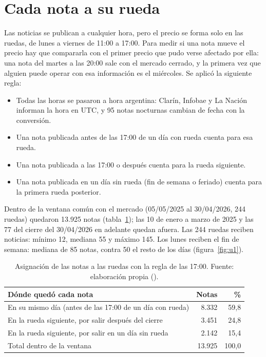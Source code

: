 \section{Cada nota a su rueda}
\label{sec:alineacion}

Las noticias se publican a cualquier hora, pero el precio se forma solo en las ruedas, de lunes
a viernes de 11:00 a 17:00. Para medir si una nota mueve el precio hay que compararla con el
primer precio que pudo verse afectado por ella: una nota del martes a las 20:00 sale con el
mercado cerrado, y la primera vez que alguien puede operar con esa información es el miércoles.
Se aplicó la siguiente regla:

\begin{itemize}
  \item Todas las horas se pasaron a hora argentina: Clarín, Infobae y La Nación informan la
        hora en UTC, y 95 notas nocturnas cambian de fecha con la conversión.
  \item Una nota publicada antes de las 17:00 de un día con rueda cuenta para esa rueda.
  \item Una nota publicada a las 17:00 o después cuenta para la rueda siguiente.
  \item Una nota publicada en un día sin rueda (fin de semana o feriado) cuenta para la
        primera rueda posterior.
\end{itemize}

Dentro de la ventana común con el mercado (05/05/2025 al 30/04/2026, 244 ruedas) quedaron
13.925 notas (tabla~\ref{tab:alineacion}); las 10 de enero a marzo de 2025 y las 77 del cierre
del 30/04/2026 en adelante quedan afuera. Las 244 ruedas reciben noticias: mínimo 12, mediana 55
y máximo 145. Los lunes reciben el fin de semana: mediana de 85 notas, contra 50 el resto de los
días (figura~\ref{fig:u1}).

\begin{table}[H]
\centering\small
\begin{tabular}{@{}lrr@{}}
\toprule
\textbf{Dónde quedó cada nota} & \textbf{Notas} & \textbf{\%} \\
\midrule
En su mismo día (antes de las 17:00 de un día con rueda) & 8.332 & 59,8 \\
En la rueda siguiente, por salir después del cierre & 3.451 & 24,8 \\
En la rueda siguiente, por salir en un día sin rueda & 2.142 & 15,4 \\
\midrule
Total dentro de la ventana & 13.925 & 100,0 \\
\bottomrule
\end{tabular}
\caption{Asignación de las notas a las ruedas con la regla de las 17:00. Fuente: elaboración
propia ().}
\label{tab:alineacion}
\end{table}

